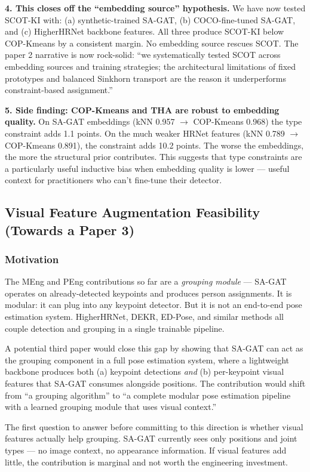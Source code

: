 \textbf{4. This closes off the ``embedding source'' hypothesis.} We have now tested SCOT-KI with: (a) synthetic-trained SA-GAT, (b) COCO-fine-tuned SA-GAT, and (c) HigherHRNet backbone features. All three produce SCOT-KI below COP-Kmeans by a consistent margin. No embedding source rescues SCOT. The paper 2 narrative is now rock-solid: ``we systematically tested SCOT across embedding sources and training strategies; the architectural limitations of fixed prototypes and balanced Sinkhorn transport are the reason it underperforms constraint-based assignment.''

\textbf{5. Side finding: COP-Kmeans and THA are robust to embedding quality.} On SA-GAT embeddings (kNN 0.957 $\to$ COP-Kmeans 0.968) the type constraint adds 1.1 points. On the much weaker HRNet features (kNN 0.789 $\to$ COP-Kmeans 0.891), the constraint adds 10.2 points. The worse the embeddings, the more the structural prior contributes. This suggests that type constraints are a particularly useful inductive bias when embedding quality is lower --- useful context for practitioners who can't fine-tune their detector.


\subsection{Visual Feature Augmentation Feasibility (Towards a Paper 3)}

\subsubsection{Motivation}

The MEng and PEng contributions so far are a \emph{grouping module} --- SA-GAT operates on already-detected keypoints and produces person assignments. It is modular: it can plug into any keypoint detector. But it is not an end-to-end pose estimation system. HigherHRNet, DEKR, ED-Pose, and similar methods all couple detection and grouping in a single trainable pipeline.

A potential third paper would close this gap by showing that SA-GAT can act as the grouping component in a full pose estimation system, where a lightweight backbone produces both (a) keypoint detections \emph{and} (b) per-keypoint visual features that SA-GAT consumes alongside positions. The contribution would shift from ``a grouping algorithm'' to ``a complete modular pose estimation pipeline with a learned grouping module that uses visual context.''

The first question to answer before committing to this direction is whether visual features actually help grouping. SA-GAT currently sees only positions and joint types --- no image context, no appearance information. If visual features add little, the contribution is marginal and not worth the engineering investment.


